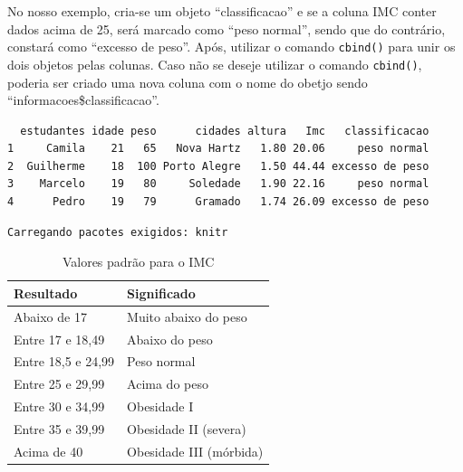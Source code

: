 \documentclass[12pt,brazil,oneside]{book}
\newenvironment{Shaded}{\begin{snugshade}}{\end{snugshade}}
\newcommand{\CommentTok}[1]{\textcolor[rgb]{0.56,0.35,0.01}{\textit{#1}}}
\newcommand{\DecValTok}[1]{\textcolor[rgb]{0.00,0.00,0.81}{#1}}
\newcommand{\KeywordTok}[1]{\textcolor[rgb]{0.13,0.29,0.53}{\textbf{#1}}}
\newcommand{\NormalTok}[1]{#1}
\newcommand{\OperatorTok}[1]{\textcolor[rgb]{0.81,0.36,0.00}{\textbf{#1}}}
\newcommand{\StringTok}[1]{\textcolor[rgb]{0.31,0.60,0.02}{#1}}
\begin{document}
No nosso exemplo, cria-se um objeto ``classificacao'' e se a coluna IMC conter dados acima de 25, será marcado como ``peso normal'', sendo que do contrário, constará como ``excesso de peso''. Após, utilizar o comando \texttt{cbind()} para unir os dois objetos pelas colunas. Caso não se deseje utilizar o comando \texttt{cbind()}, poderia ser criado uma nova coluna com o nome do obetjo sendo ``informacoes\$classificacao''.

\begin{Shaded}
\end{Shaded}

\begin{verbatim}
  estudantes idade peso      cidades altura   Imc   classificacao
1     Camila    21   65   Nova Hartz   1.80 20.06     peso normal
2  Guilherme    18  100 Porto Alegre   1.50 44.44 excesso de peso
3    Marcelo    19   80     Soledade   1.90 22.16     peso normal
4      Pedro    19   79      Gramado   1.74 26.09 excesso de peso
\end{verbatim}

\begin{verbatim}
Carregando pacotes exigidos: knitr
\end{verbatim}

\begin{table}[t]

\caption{\label{tab:imct}Valores padrão para o IMC}
\centering
\begin{tabular}{l|l}
\hline
Resultado & Significado\\
\hline
Abaixo de 17 & Muito abaixo do peso\\
\hline
Entre 17 e 18,49 & Abaixo do peso\\
\hline
Entre 18,5 e 24,99 & Peso normal\\
\hline
Entre 25 e 29,99 & Acima do peso\\
\hline
Entre 30 e 34,99 & Obesidade I\\
\hline
Entre 35 e 39,99 & Obesidade II (severa)\\
\hline
Acima de 40 & Obesidade III (mórbida)\\
\hline
\end{tabular}
\end{table}
\end{document}
